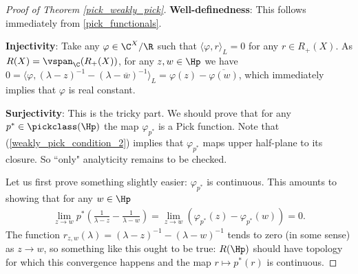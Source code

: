 \begin{proof}[Proof of Theorem \ref{pick_weakly_pick}]
	\textbf{Well-definedness}: This follows immediately from \ref{pick_functionals}.

	\textbf{Injectivity}: Take any $\varphi \in \C^{X}/\R$ such that $\langle \varphi, r \rangle_{L} = 0$ for any $r \in R_{+}(X)$. As $R(X) = \vspan_{\C}(R_{+}(X))$, for any $z, w \in \Hp$ we have $0 = \langle \varphi, (\lambda - z)^{-1} - (\lambda - \overline{w})^{-1}\rangle_{L} = \varphi(z) - \overline{\varphi(w)}$, which immediately implies that $\varphi$ is real constant.

	\textbf{Surjectivity}: This is the tricky part. We should prove that for any $p^{*} \in \pickclass(\Hp)$ the map $\varphi_{p^{*}}$ is a Pick function. Note that (\ref{weakly_pick_condition_2}) implies that $\varphi_{p^{*}}$ maps upper half-plane to its closure. So ``only" analyticity remains to be checked.

	Let us first prove something slightly easier: $\varphi_{p^{*}}$ is continuous. This amounts to showing that for any $w \in \Hp$
	\begin{align*}
		\lim_{z \to w} p^{*}\left(\frac{1}{\lambda - z} - \frac{1}{\lambda - w} \right) = \lim_{z \to w}\left(\varphi_{p^{*}}(z) - \varphi_{p^{*}}(w)\right) = 0.
	\end{align*}
	The function $r_{z, w}(\lambda) = (\lambda - z)^{-1} - (\lambda - w)^{-1}$ tends to zero (in some sense) as $z \to w$, so something like this ought to be true: $R(\Hp)$ should have topology for which this convergence happens and the map $r \mapsto p^{*} (r)$ is continuous.


\end{proof}
